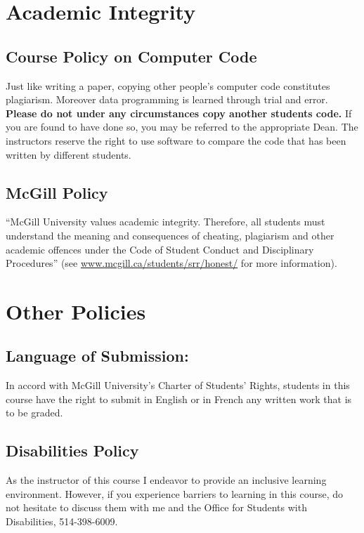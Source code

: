\documentclass[11pt,]{article}
\begin{document}
\section{Academic Integrity}\label{academic-integrity}

\subsection{Course Policy on Computer
Code}\label{course-policy-on-computer-code}

Just like writing a paper, copying other people's computer code
constitutes plagiarism. Moreover data programming is learned through
trial and error. \textbf{Please do not under any circumstances copy
another students code.} If you are found to have done so, you may be
referred to the appropriate Dean. The instructors reserve the right to
use software to compare the code that has been written by different
students.

\subsection{McGill Policy}\label{mcgill-policy}

``McGill University values academic integrity. Therefore, all students
must understand the meaning and consequences of cheating, plagiarism and
other academic offences under the Code of Student Conduct and
Disciplinary Procedures'' (see \url{www.mcgill.ca/students/srr/honest/}
for more information).

\section{Other Policies}\label{other-policies}

\subsection{Language of Submission:}\label{language-of-submission}

In accord with McGill University's Charter of Students' Rights, students
in this course have the right to submit in English or in French any
written work that is to be graded.

\subsection{Disabilities Policy}\label{disabilities-policy}

As the instructor of this course I endeavor to provide an inclusive
learning environment. However, if you experience barriers to learning in
this course, do not hesitate to discuss them with me and the Office for
Students with Disabilities, 514-398-6009.
\end{document}
